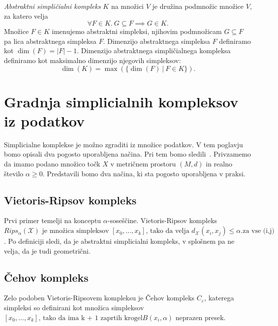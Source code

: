 \begin{definicija}
  \textit{Abstraktni simpli\v{c}ialni kompleks} \(K\) na množici \(V\) je družina podmnožic množice \(V\), za katero velja
  \[
    \forall F \in K. \ G \subseteq F \implies G \in K.
  \]
  Množice \(F \in K\) imenujemo abstraktni simpleksi, njihovim podmnožicam \(G \subseteq F\) pa lica abstraktnega simpleksa \(F\). Dimenzijo abstraktnega simpleksa \(F\) definiramo kot \(\dim(F) = |F| - 1\). Dimenzijo abstraktnega simpli\v{c}ialnega kompleksa definiramo kot maksimalno dimenzijo njegovih simpleksov:
  \[
    \dim(K) = \max(\{\dim(F) \ | \ F \in K\}).
  \]
\end{definicija}


\section{Gradnja simplicialnih kompleksov iz podatkov}
Simplicialne komplekse je možno zgraditi iz množice podatkov. V tem poglavju bomo opisali dva pogosto uporabljena načina. Pri tem bomo sledili~\cite{10.1007/978-3-319-45378-1_1}. Privzamemo da imamo podano množico točk $X$ v metričnem prostoru $(M, d)$ in realno število $\alpha \geq 0$. Predstavili bomo dva načina, ki sta pogosto uporabljena v praksi.~\cite{kun2015cech}

\subsection{Vietoris-Ripsov kompleks}
Prvi primer temelji na konceptu $\alpha$-soseščine. Vietoris-Ripsov kompleks $Rips_{\alpha}(\mathcal{X}) \text{ je množica simpleksov } [x_0, \ldots, x_k] \text{, tako da velja } d_{\mathcal{X}}(x_i, x_j) \leq \alpha. \text{za vse (i,j)}$. Po definiciji sledi, da je abstraktni simplicialni kompleks, v splošnem pa ne velja, da je tudi geometrični.

\subsection{Čehov kompleks}
Zelo podoben Vietoris-Ripsovem kompleksu je Čehov kompleks $C_\varepsilon$, katerega simpleksi so definirani kot množica simpleksov $[x_0, \ldots, x_k] \text{, tako da ima k + 1 zaprtih krogel} B(x_i, \alpha)$ neprazen presek.

